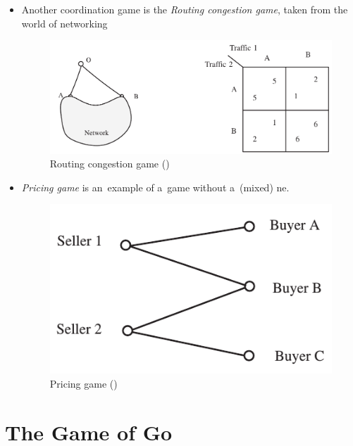 \begin{itemize}
  \item Another coordination game is the \emph{Routing congestion game}, taken from the world of networking

    \begin{figure}[H]
      \centering
      \includegraphics[width=0.65\paperwidth]{../img/routing-congestion-game.png}
      \caption[Routing congestion game]{Routing congestion game (\cite{AGT07})}
      \label{fig:routing-congestion}
    \end{figure}

  \item \emph{Pricing game} is an~example of a~game without a~(mixed) \acrshort{ne}.

    \begin{figure}[H]
      \centering
      \includegraphics[width=\figurewidthratio\paperwidth]{../img/pricing-game.png}
      \caption[Pricing game]{Pricing game (\cite{AGT07})}
      \label{fig:pricing-game}
    \end{figure}
\end{itemize}


\section{The Game of Go}
\label{sec:Go}

